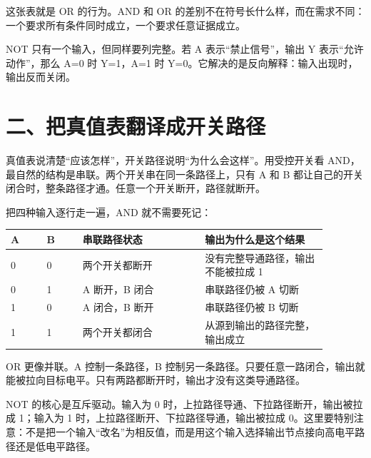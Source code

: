 这张表就是 OR 的行为。AND 和 OR 的差别不在符号长什么样，而在需求不同：一个要求所有条件同时成立，一个要求任意证据成立。

NOT 只有一个输入，但同样要列完整。若 A 表示“禁止信号”，输出 Y 表示“允许动作”，那么 A=0 时 Y=1，A=1 时 Y=0。它解决的是反向解释：输入出现时，输出反而关闭。

\section{二、把真值表翻译成开关路径}

真值表说清楚“应该怎样”，开关路径说明“为什么会这样”。用受控开关看 AND，最自然的结构是串联。两个开关串在同一条路径上，只有 A 和 B 都让自己的开关闭合时，整条路径才通。任意一个开关断开，路径就断开。

把四种输入逐行走一遍，AND 就不需要死记：

\begin{longtable}{p{0.1\linewidth}p{0.1\linewidth}p{0.34\linewidth}p{0.34\linewidth}}
\toprule
A & B & 串联路径状态 & 输出为什么是这个结果 \\
\midrule
0 & 0 & 两个开关都断开 & 没有完整导通路径，输出不能被拉成 1 \\
0 & 1 & A 断开，B 闭合 & 串联路径仍被 A 切断 \\
1 & 0 & A 闭合，B 断开 & 串联路径仍被 B 切断 \\
1 & 1 & 两个开关都闭合 & 从源到输出的路径完整，输出成立 \\
\bottomrule
\end{longtable}

OR 更像并联。A 控制一条路径，B 控制另一条路径。只要任意一路闭合，输出就能被拉向目标电平。只有两路都断开时，输出才没有这类导通路径。

NOT 的核心是互斥驱动。输入为 0 时，上拉路径导通、下拉路径断开，输出被拉成 1；输入为 1 时，上拉路径断开、下拉路径导通，输出被拉成 0。这里要特别注意：不是把一个输入“改名”为相反值，而是用这个输入选择输出节点接向高电平路径还是低电平路径。

